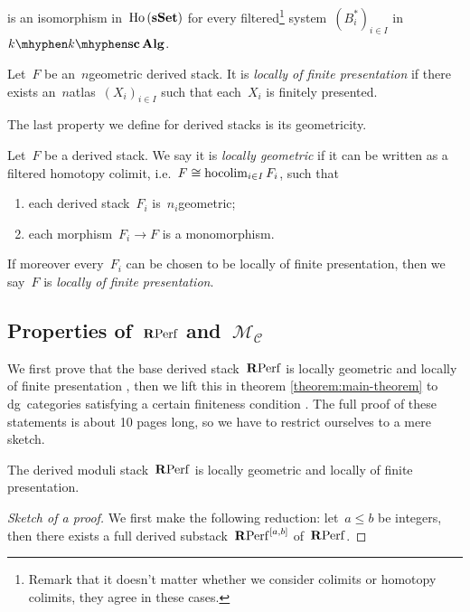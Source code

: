 \begin{refsection}
\begin{definition}
\begin{equation}
  \end{equation}
  is an isomorphism in~$\operatorname{\mathrm{Ho} \,}(\mathbf{s\,\!\mathbf{Set}})$ for every filtered\footnote{Remark that it doesn't matter whether we consider colimits or homotopy colimits, they agree in these cases.} system~$(B_i^*)_{i\in I}$ in~$k\mhyphen\scAlg$.
\end{definition}
\begin{definition}
  Let~$F$ be an~$n$\dash geometric derived stack. It is \emph{locally of finite presentation} if there exists an~$n$\dash atlas~$(X_i)_{i\in I}$ such that each~$X_i$ is finitely presented.
\end{definition}
The last property we define for derived stacks is its geometricity.
\begin{definition}
  Let~$F$ be a derived stack. We say it is \emph{locally geometric} if it can be written as a filtered homotopy colimit, i.e.\ $F\cong\operatorname*{hocolim}_{i\in I}F_i$, such that
  \begin{enumerate}
    \item each derived stack~$F_i$ is~$n_i$\dash geometric;
    \item each morphism~$F_i\to F$ is a monomorphism.
  \end{enumerate}
  If moreover every~$F_i$ can be chosen to be locally of finite presentation, then we say~$F$ is \emph{locally of finite presentation}.
\end{definition}

\subsection{Properties of~$\mathbf{R}\mathrm{Perf}$ and~$\mathcal{M}_{\mathcal{C}}$}
We first prove that the base derived stack~$\mathbf{R}\mathrm{Perf}$ is locally geometric and locally of finite presentation \cite[proposition 3.7]{toen-vaquie}, then we lift this in theorem \ref{theorem:main-theorem} to dg~categories satisfying a certain finiteness condition \cite[theorem 3.6]{toen-vaquie}. The full proof of these statements is about 10 pages long, so we have to restrict ourselves to a mere sketch.
\begin{theorem}
  \label{theorem:main-theorem-RPerf}
  The derived moduli stack~$\mathbf{R}\mathrm{Perf}$ is locally geometric and locally of finite presentation.

  \begin{proof}[Sketch of a proof]
    We first make the following reduction: let~$a\leq b$ be integers, then there exists a full derived substack~$\mathbf{R}\mathrm{Perf}^{[a,b]}$ of~$\mathbf{R}\mathrm{Perf}$.
    

\end{proof}
\end{theorem}
\end{refsection}
